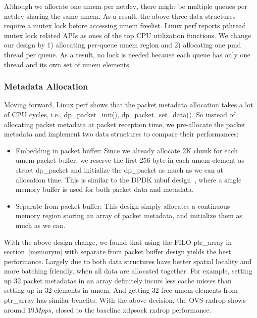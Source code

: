 \documentclass[10pt]{sigplanconf}
\begin{document}
Although we allocate one umem per netdev, there might be multiple queues per
netdev sharing the same umem. As a result, the above three data structures
require a mutex lock before accessing umem freelist. Linux perf reports
pthread mutex lock related APIs as ones of the top CPU utilization functions.
We change our design by 1) allocating per-queue umem region and 2)
allocating one pmd thread per queue. As a result, no lock is needed because
each queue has only one thread and its own set of umem elements.

\subsubsection{Metadata Allocation}
Moving forward, Linux perf shows that the packet metadata allocation
takes a lot of CPU cycles, i.e.,  dp\_packet\_init(), dp\_packet\_set\_data().
So instead of allocating packet metadata at packet reception time, we pre-allocate
the packet metadata and implement two data structures to compare their performances:
\begin{itemize}
\item Embedding in packet buffer: Since we already allocate 2K chunk for each
umem packet buffer, we reserve the first 256-byte in each umem element as struct dp\_packet
and initialize the dp\_packet as much as we can at allocation time.
This is similar to the DPDK mbuf design~\cite{dpdkmbuf}, where a single memory buffer
is used for both packet data and metadata.
\item Separate from packet buffer: This design simply allocates a continuous memory region
storing an array of packet metadata, and initialize them as much as we can.
\end{itemize}


With the above design change, we found that using the FILO-ptr\_array in section~\ref{memorym} with
separate from packet buffer design yields the best performance. Largely due to both data structures
have better spatial locality and more batching friendly, when all data are allocated together.
For example, setting up 32 packet metadatas in an array definitely incurs
less cache misses than setting up in 32 elements in umem.
And getting 32 free umem elements from ptr\_array has similar benefits.
With the above decision, the OVS rxdrop shows around $19Mpps$, closed
to the baseline xdpsock rxdrop performance.
\end{document}
